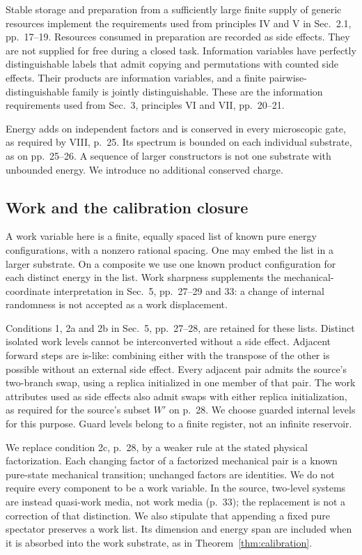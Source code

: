 Stable storage and preparation from a sufficiently large finite supply of generic resources implement the requirements used from principles IV and V in Sec.~2.1, pp.~17--19. Resources consumed in preparation are recorded as side effects. They are not supplied for free during a closed task. Information variables have perfectly distinguishable labels that admit copying and permutations with counted side effects. Their products are information variables, and a finite pairwise-distinguishable family is jointly distinguishable. These are the information requirements used from Sec.~3, principles VI and VII, pp.~20--21.

Energy adds on independent factors and is conserved in every microscopic gate, as required by VIII, p.~25. Its spectrum is bounded on each individual substrate, as on pp.~25--26. A sequence of larger constructors is not one substrate with unbounded energy. We introduce no additional conserved charge.

\subsection{Work and the calibration closure}
A work variable here is a finite, equally spaced list of known pure energy configurations, with a nonzero rational spacing. One may embed the list in a larger substrate. On a composite we use one known product configuration for each distinct energy in the list. Work sharpness supplements the mechanical-coordinate interpretation in Sec.~5, pp.~27--29 and 33: a change of internal randomness is not accepted as a work displacement.

Conditions 1, 2a and 2b in Sec.~5, pp.~27--28, are retained for these lists. Distinct isolated work levels cannot be interconverted without a side effect. Adjacent forward steps are is-like: combining either with the transpose of the other is possible without an external side effect. Every adjacent pair admits the source's two-branch swap, using a replica initialized in one member of that pair. The work attributes used as side effects also admit swaps with either replica initialization, as required for the source's subset $W'$ on p.~28. We choose guarded internal levels for this purpose. Guard levels belong to a finite register, not an infinite reservoir.

We replace condition 2c, p.~28, by a weaker rule at the stated physical factorization. Each changing factor of a factorized mechanical pair is a known pure-state mechanical transition; unchanged factors are identities. We do not require every component to be a work variable. In the source, two-level systems are instead quasi-work media, not work media (p.~33); the replacement is not a correction of that distinction. We also stipulate that appending a fixed pure spectator preserves a work list. Its dimension and energy span are included when it is absorbed into the work substrate, as in Theorem~\ref{thm:calibration}.

